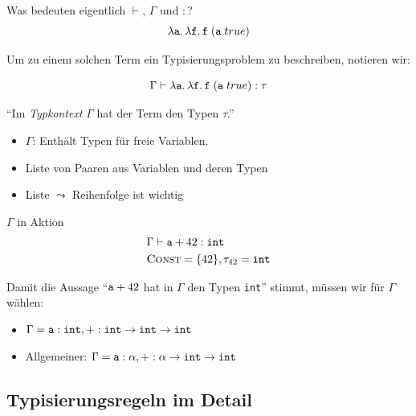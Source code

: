 \documentclass{beamer}
\begin{document}
\begin{frame}{Was bedeuten eigentlich $\vdash$, $\Gamma$ und $:$?}
  \begin{equation*}
    \lambda \texttt{a}.\, \lambda \texttt{f}.\, \texttt{f}\;(\texttt{a}\;true)
  \end{equation*}

  Um zu einem solchen Term ein Typisierungsproblem zu beschreiben, notieren wir:

  \begin{equation*}
    \Gamma \vdash \lambda \texttt{a}.\, \lambda \texttt{f}.\, \texttt{f}\;(\texttt{a}\;true) : \tau
  \end{equation*}

  \enquote{Im \emph{Typkontext} $\Gamma$ hat der Term den Typen $\tau$.}

  \begin{itemize}
    \item $\Gamma$: Enthält Typen für freie Variablen.
    \item Liste von Paaren aus Variablen und deren Typen
    \item Liste $\leadsto$ Reihenfolge ist wichtig
  \end{itemize}
\end{frame}

\begin{frame}{$\Gamma$ in Aktion}
  \begin{align*}
    &\Gamma \vdash \texttt{a} + 42 : \texttt{int} \\
    &\textsc{Const} = \{ 42 \}, \tau_{42} = \texttt{int}
  \end{align*}

  Damit die Aussage \enquote{$\texttt{a} + 42$ hat in $\Gamma$ den Typen \texttt{int}} stimmt, müssen wir für $\Gamma$ wählen:
  
  \begin{itemize}
    \pause
    \item $\Gamma = \texttt{a} : \texttt{int}, + : \texttt{int} \to \texttt{int} \to \texttt{int}$
    \pause
    \item Allgemeiner: $\Gamma = \texttt{a} : \alpha, + : \alpha \to \texttt{int} \to \texttt{int}$
  \end{itemize}
\end{frame}

\subsection{Typisierungsregeln im Detail}
\end{document}
